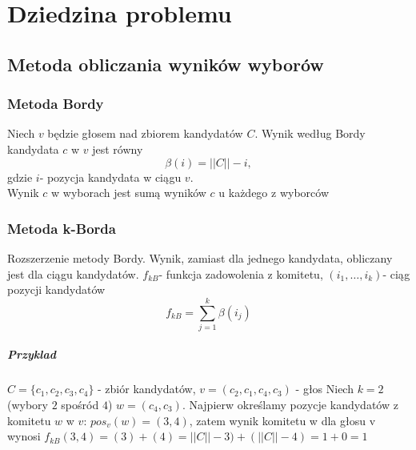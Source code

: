 \documentclass[pdflatex,11pt]{../aghdoc_version2}
\author{Tomasz Kasprzyk, Daniel Ogiela, Jakub Stępak}
\date{2016}
\begin{document}
\titlepages

\tableofcontents\thispagestyle{fancy}


\chapter{Dziedzina problemu}
\label{cha:dziedzina_problemu}

\section{Metoda obliczania wyników wyborów}
\label{sec:metoda_obliczania_wynikow_wyborow}

\subsection{Metoda Bordy}
\label{subsec:metoda_bordy}

Niech $v$ będzie głosem nad zbiorem kandydatów $C$. Wynik według Bordy kandydata $c$ w $v$ jest równy \begin{equation}
\beta(i)=||C||-i,
\end{equation}
gdzie $i$- pozycja kandydata w ciągu $v$.\\
Wynik $c$ w wyborach jest sumą wyników $c$ u każdego z wyborców


\subsection{Metoda k-Borda}
\label{subsec:metoda_k_borda}

Rozszerzenie metody Bordy. Wynik, zamiast dla jednego kandydata, obliczany jest dla ciągu kandydatów. $f_{kB}$- funkcja zadowolenia z komitetu, $(i_1,\dots, i_k)$- ciąg pozycji kandydatów
\begin{equation}
f_{kB}=\sum_{j=1}^{k} \beta(i_j)
\end{equation}

\paragraph{Przyklad}
$C=\{c_1,c_2,c_3,c_4\}$ - zbiór kandydatów,
$v=(c_2,c_1,c_4,c_3)$ - głos
Niech $k = 2$ (wybory $2$ spośród $4$)
$w=(c_4,c_3)$.
Najpierw określamy pozycje kandydatów z komitetu $w$ w $v$:
$pos_v(w)=(3,4)$, zatem wynik komitetu w dla głosu v wynosi
$f_{kB}(3,4) = (3) + (4) = ||C|| - 3 ) + ( ||C|| - 4 ) = 1 + 0 = 1$
\end{document}
